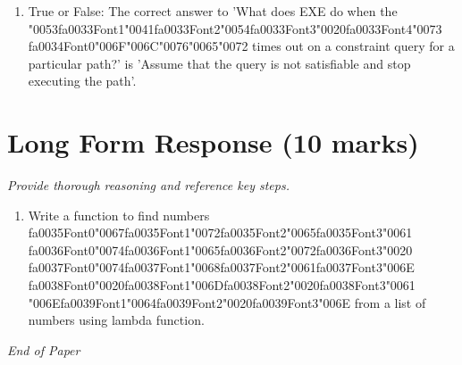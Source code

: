 \documentclass[12pt]{article}
\begin{document}
\begin{enumerate}[label=\arabic*.]
\item True or False: The correct answer to 'What does EXE do when the {\char"0053}{\csname fa0033Font1\endcsname\char"0041}{\csname fa0033Font2\endcsname\char"0054}{\csname fa0033Font3\endcsname\char"0020}{\csname fa0033Font4\endcsname\char"0073} {\csname fa0034Font0\endcsname\char"006F}{\char"006C}{\char"0076}{\char"0065}{\char"0072} times out on a constraint query for a particular path?' is 'Assume that the query is not satisfiable and stop executing the path'.
\end{enumerate}

\section*{Long Form Response (10 marks)}
\textit{Provide thorough reasoning and reference key steps.}
\begin{enumerate}[label=\arabic*.]
\item Write a function to find numbers {\csname fa0035Font0\endcsname\char"0067}{\csname fa0035Font1\endcsname\char"0072}{\csname fa0035Font2\endcsname\char"0065}{\csname fa0035Font3\endcsname\char"0061} {\csname fa0036Font0\endcsname\char"0074}{\csname fa0036Font1\endcsname\char"0065}{\csname fa0036Font2\endcsname\char"0072}{\csname fa0036Font3\endcsname\char"0020} {\csname fa0037Font0\endcsname\char"0074}{\csname fa0037Font1\endcsname\char"0068}{\csname fa0037Font2\endcsname\char"0061}{\csname fa0037Font3\endcsname\char"006E} {\csname fa0038Font0\endcsname\char"0020}{\csname fa0038Font1\endcsname\char"006D}{\csname fa0038Font2\endcsname\char"0020}{\csname fa0038Font3\endcsname\char"0061} {\char"006E}{\csname fa0039Font1\endcsname\char"0064}{\csname fa0039Font2\endcsname\char"0020}{\csname fa0039Font3\endcsname\char"006E} from a list of numbers using lambda
function.
\end{enumerate}

\vfill
\noindent\textit{End of Paper}
\end{document}
